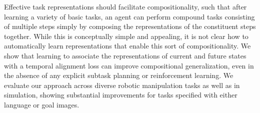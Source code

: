 Effective task representations should facilitate compositionality, such that after learning a variety of basic tasks, an agent can perform compound tasks consisting of multiple steps simply by composing the representations of the constituent steps together.
While this is conceptually simple and appealing, it is not clear how to automatically learn representations that enable this sort of compositionality.
We show that learning to associate the representations of current and future states with a temporal alignment loss can improve compositional generalization, even in the absence of any explicit subtask planning or reinforcement learning.
We evaluate our approach across diverse robotic manipulation tasks as well as in simulation, showing substantial improvements for tasks specified with either language or goal images.

